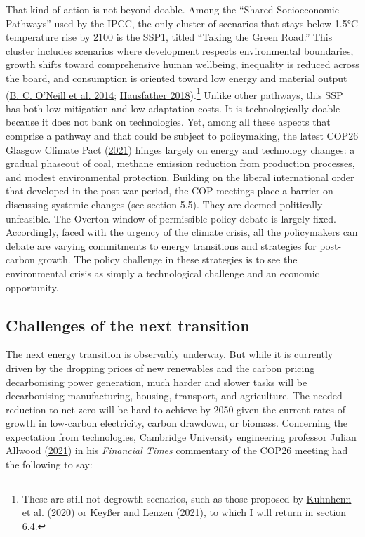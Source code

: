 \documentclass[a4paper, nobind]{templates/ociamthesis}
\begin{document}
That kind of action is not beyond doable. Among the ``Shared Socioeconomic Pathways'' used by the IPCC, the only cluster of scenarios that stays below 1.5°C temperature rise by 2100 is the SSP1, titled ``Taking the Green Road.'' This cluster includes scenarios where development respects environmental boundaries, growth shifts toward comprehensive human wellbeing, inequality is reduced across the board, and consumption is oriented toward low energy and material output (\protect\hyperlink{ref-oneill_new_2014}{B. C. O'Neill et al. 2014}; \protect\hyperlink{ref-hausfather_explainer_2018}{Hausfather 2018}).\footnote{These are still not degrowth scenarios, such as those proposed by \protect\hyperlink{ref-kuhnhenn_societal_2020}{Kuhnhenn et al.} (\protect\hyperlink{ref-kuhnhenn_societal_2020}{2020}) or \protect\hyperlink{ref-keysser_15_2021}{Keyßer and Lenzen} (\protect\hyperlink{ref-keysser_15_2021}{2021}), to which I will return in section 6.4.} Unlike other pathways, this SSP has both low mitigation and low adaptation costs. It is technologically doable because it does not bank on technologies. Yet, among all these aspects that comprise a pathway and that could be subject to policymaking, the latest COP26 Glasgow Climate Pact (\protect\hyperlink{ref-unfccc_glasgow_2021}{2021}) hinges largely on energy and technology changes: a gradual phaseout of coal, methane emission reduction from production processes, and modest environmental protection. Building on the liberal international order that developed in the post-war period, the COP meetings place a barrier on discussing systemic changes (see section 5.5). They are deemed politically unfeasible. The Overton window of permissible policy debate is largely fixed. Accordingly, faced with the urgency of the climate crisis, all the policymakers can debate are varying commitments to energy transitions and strategies for post-carbon growth. The policy challenge in these strategies is to see the environmental crisis as simply a technological challenge and an economic opportunity.

\hypertarget{challenges-of-the-next-transition}{%
\subsection{Challenges of the next transition}\label{challenges-of-the-next-transition}}

The next energy transition is observably underway. But while it is currently driven by the dropping prices of new renewables and the carbon pricing decarbonising power generation, much harder and slower tasks will be decarbonising manufacturing, housing, transport, and agriculture. The needed reduction to net-zero will be hard to achieve by 2050 given the current rates of growth in low-carbon electricity, carbon drawdown, or biomass. Concerning the expectation from technologies, Cambridge University engineering professor Julian Allwood (\protect\hyperlink{ref-allwood_technology_2021}{2021}) in his \emph{Financial Times} commentary of the COP26 meeting had the following to say:
\end{document}
